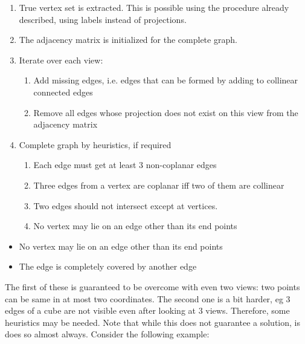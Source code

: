\documentclass[
11pt, %
english, %
singlespacing, %
headsepline, %
]{MastersDoctoralThesis} %
\begin{document}
\begin{enumerate}
\item True vertex set is extracted. This is possible using the procedure already described, using labels instead of projections. 
\item The adjacency matrix is initialized for the complete graph.
\item Iterate over each view:
\begin{enumerate}
\item Add missing edges, i.e. edges that can be formed by adding to collinear connected edges
\item Remove all edges whose projection does not exist on this view from the adjacency matrix
\end{enumerate}
\item Complete graph by heuristics, if required
\begin{enumerate}
\item Each edge must get at least 3 non-coplanar edges
\item Three edges from a vertex are coplanar iff two of them are collinear
\item Two edges should not intersect except at vertices.
\item No vertex may lie on an edge other than its end points
\end{enumerate}
\end{enumerate}
\begin{itemize}
\item No vertex may lie on an edge other than its end points
\item The edge is completely covered by another edge
\end{itemize}
The first of these is guaranteed to be overcome with even two views: two points can be same in at most two coordinates. The second one is a bit harder, eg 3 edges of a cube are not visible even after looking at 3 views. Therefore, some heuristics may be needed. Note that while this does not guarantee a solution, is does so almost always.
Consider the following example: \\
\end{document}
